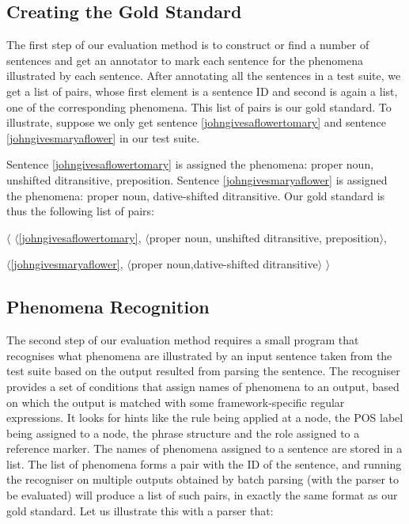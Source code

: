 \documentclass[11pt]{article}
\def\<{$\langle$}
\def\>{$\rangle$}
\begin{document}
\subsection{Creating the Gold Standard} 
The first step of our evaluation method is to construct or find a number of sentences and get an annotator to mark each sentence for the phenomena illustrated by each sentence. After annotating all the sentences in a test suite, we get a list of pairs, whose first element is a sentence ID and second is again a list, one of the corresponding phenomena. This list of pairs is our gold standard. To illustrate, suppose we only get sentence \ref{johngivesaflowertomary} and sentence \ref{johngivesmaryaflower} in our test suite.

\label{johngivesaflowertomary}



\label{johngivesmaryaflower}

Sentence \ref{johngivesaflowertomary} is assigned the phenomena: proper noun, unshifted ditransitive, preposition. Sentence \ref{johngivesmaryaflower} is assigned the phenomena: proper noun, dative-shifted ditransitive. Our gold standard is thus the following list of pairs: 

\smallskip

\< \<\ref{johngivesaflowertomary}, $\langle{}${\smaller proper noun, unshifted ditransitive, preposition}\>,

\hspace{1.5mm} \<\ref{johngivesmaryaflower}, $\langle{}${\smaller proper noun,dative-shifted ditransitive}$\rangle$ 
$\rangle$



\subsection{Phenomena Recognition}


The second step of our evaluation method requires a small program that recognises what phenomena are illustrated by an input sentence taken from the test suite based on the output resulted from parsing the sentence. The recogniser provides a set of conditions that assign names of phenomena to an output, based on which the output is matched with some framework-specific regular expressions. It looks for hints like the rule being applied at a node, the POS label being assigned to a node, the phrase structure and the role assigned to a reference marker. The names of phenomena assigned to a sentence are stored in a list. The list of phenomena forms a pair with the ID of the sentence, and running the recogniser on multiple outputs obtained by batch parsing (with the parser to be evaluated) will produce a list of such pairs, in exactly the same format as our gold standard. Let us illustrate this with a parser that:
\end{document}
